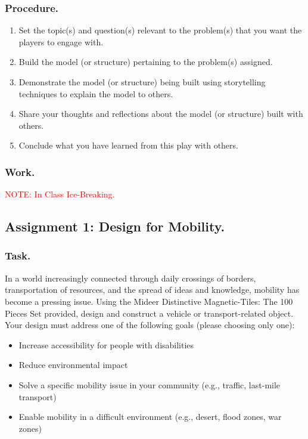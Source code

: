 \documentclass[11pt]{book}
\begin{document}
				\subsubsection{Procedure.}
					\begin{enumerate}
						\item Set the topic(s) and question(s) relevant to the problem(s) that you want the players to engage with.
						\item Build the model (or structure) pertaining to the problem(s) assigned.
						\item Demonstrate the model (or structure) being built using storytelling techniques to explain the model to others.
						\item Share your thoughts and reflections about the model (or structure) built with others.
						\item Conclude what you have learned from this play with others.
					\end{enumerate}
					
				\subsubsection{Work.}
						\textcolor{red}{NOTE: In Class Ice-Breaking.}
			\subsection{Assignment 1: Design for Mobility.}
				\subsubsection{Task.}
				In a world increasingly connected through daily crossings of borders, transportation of resources, and the spread of ideas and knowledge, mobility has become a pressing issue. Using the Mideer Distinctive Magnetic-Tiles: The 100 Pieces Set provided, design and construct a vehicle or transport-related object. Your design must address one of the following goals (please choosing only one):
					\begin{itemize}
						\item Increase accessibility for people with disabilities
						\item Reduce environmental impact
						\item Solve a specific mobility issue in your community (e.g., traffic, last-mile transport)
						\item Enable mobility in a difficult environment (e.g., desert, flood zones, war zones)
					\end{itemize}
				
\end{document}
